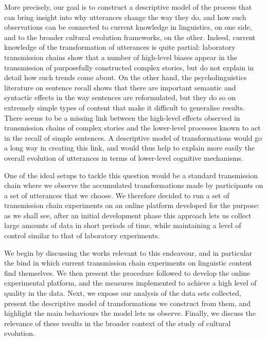\documentclass[a4paper,fleqn]{cas-dc}
\begin{document}
More precisely, our goal is to construct a descriptive model of the
process that can bring insight into why utterances change the way they
do, and how such observations can be connected to current knowledge in
linguistics, on one side, and to the broader cultural evolution
frameworks, on the other. Indeed, current knowledge of the
transformation of utterances is quite partial: laboratory transmission
chains show that a number of high-level biases appear in the
transmission of purposefully constructed complex stories, but do not
explain in detail how such trends come about. On the other hand, the
psycholinguistics literature on sentence recall shows that there are
important semantic and syntactic effects in the way sentences are
reformulated, but they do so on extremely simple types of content that
make it difficult to generalise results. There seems to be a missing
link between the high-level effects observed in
transmission chains of complex stories and the lower-level processes known to act in the recall of simple sentences. A descriptive
model of transformations would go a long way in creating this link, and would thus help to explain more easily the overall evolution of utterances in terms of lower-level cognitive mechanisms.

One of the ideal setups to tackle this question would be a standard transmission
chain where we observe the accumulated transformations made by
participants on a set of utterances that we choose.
We therefore decided to run a set of transmission chain experiments on an online platform developed for the purpose: as we shall see, after an initial development phase this approach lets us collect large amounts of data in short periods of time, while maintaining a level of control similar to that of laboratory experiments.

We begin by discussing the works relevant to this endeavour, and in
particular the bind in which current transmission chain experiments on
linguistic content find themselves. We then present the procedure
followed to develop the online experimental platform, and the measures
implemented to achieve a high level of quality in the data. Next, we
expose our analysis of the data sets collected, present the descriptive
model of transformations we construct from them, and highlight the main
behaviours the model lets us observe. Finally, we discuss the relevance
of these results in the broader context of the study of cultural
evolution.
\end{document}
